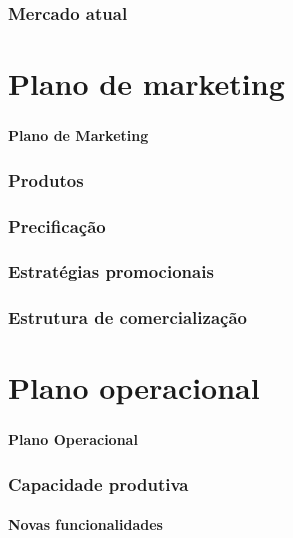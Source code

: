 \documentclass{beamer}
\begin{document}
\begin{frame}
  \frametitle{Mercado atual}
  \framesubtitle{}

\end{frame}

\section{Plano de marketing}

\begin{frame}
  \frametitle{}
  \framesubtitle{}

  \begin{center}
    {\huge\textbf{Plano de Marketing}}
  \end{center}
\end{frame}

\begin{frame}
  \frametitle{Produtos}
  \framesubtitle{}

\end{frame}

\begin{frame}
  \frametitle{Precificação}
  \framesubtitle{}

\end{frame}

\begin{frame}
  \frametitle{Estratégias promocionais}
  \framesubtitle{}

\end{frame}

\begin{frame}
  \frametitle{Estrutura de comercialização}
  \framesubtitle{}

\end{frame}

\section{Plano operacional}
\begin{frame}
  \frametitle{}
  \framesubtitle{}

  \begin{center}
    {\huge\textbf{Plano Operacional}}
  \end{center}
\end{frame}

\begin{frame}
  \frametitle{Capacidade produtiva}
  \framesubtitle{Novas funcionalidades}

\end{frame}
\end{document}

